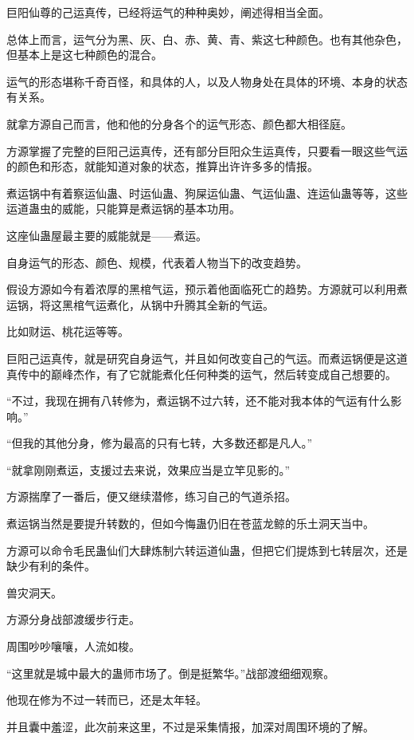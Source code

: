 
\begin{this_body}

巨阳仙尊的己运真传，已经将运气的种种奥妙，阐述得相当全面。

总体上而言，运气分为黑、灰、白、赤、黄、青、紫这七种颜色。也有其他杂色，但基本上是这七种颜色的混合。

运气的形态堪称千奇百怪，和具体的人，以及人物身处在具体的环境、本身的状态有关系。

就拿方源自己而言，他和他的分身各个的运气形态、颜色都大相径庭。

方源掌握了完整的巨阳己运真传，还有部分巨阳众生运真传，只要看一眼这些气运的颜色和形态，就能知道对象的状态，推算出许许多多的情报。

煮运锅中有着察运仙蛊、时运仙蛊、狗屎运仙蛊、气运仙蛊、连运仙蛊等等，这些运道蛊虫的威能，只能算是煮运锅的基本功用。

这座仙蛊屋最主要的威能就是——煮运。

自身运气的形态、颜色、规模，代表着人物当下的改变趋势。

假设方源如今有着浓厚的黑棺气运，预示着他面临死亡的趋势。方源就可以利用煮运锅，将这黑棺气运煮化，从锅中升腾其全新的气运。

比如财运、桃花运等等。

巨阳己运真传，就是研究自身运气，并且如何改变自己的气运。而煮运锅便是这道真传中的巅峰杰作，有了它就能煮化任何种类的运气，然后转变成自己想要的。

“不过，我现在拥有八转修为，煮运锅不过六转，还不能对我本体的气运有什么影响。”

“但我的其他分身，修为最高的只有七转，大多数还都是凡人。”

“就拿刚刚煮运，支援过去来说，效果应当是立竿见影的。”

方源揣摩了一番后，便又继续潜修，练习自己的气道杀招。

煮运锅当然是要提升转数的，但如今悔蛊仍旧在苍蓝龙鲸的乐土洞天当中。

方源可以命令毛民蛊仙们大肆炼制六转运道仙蛊，但把它们提炼到七转层次，还是缺少有利的条件。

兽灾洞天。

方源分身战部渡缓步行走。

周围吵吵嚷嚷，人流如梭。

“这里就是城中最大的蛊师市场了。倒是挺繁华。”战部渡细细观察。

他现在修为不过一转而已，还是太年轻。

并且囊中羞涩，此次前来这里，不过是采集情报，加深对周围环境的了解。


\end{this_body}
